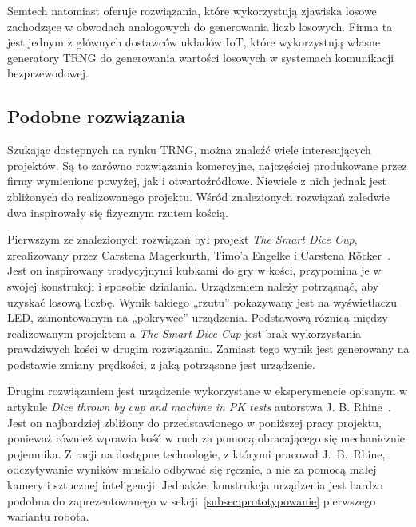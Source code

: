 Semtech natomiast oferuje rozwiązania, które wykorzystują zjawiska losowe
zachodzące w obwodach analogowych do generowania liczb losowych.
Firma ta jest jednym z głównych dostawców układów IoT, które wykorzystują własne generatory TRNG
do generowania wartości losowych w systemach komunikacji bezprzewodowej.


\subsection{Podobne rozwiązania}\label{sec:podobne-rozwiazania}

Szukając dostępnych na rynku TRNG, można znaleźć wiele interesujących projektów. Są to zarówno rozwiązania komercyjne, 
najczęściej produkowane przez firmy wymienione powyżej, jak i otwartoźródłowe. Niewiele z nich jednak jest zbliżonych 
do realizowanego projektu. Wśród znalezionych rozwiązań zaledwie dwa inspirowały się fizycznym rzutem kością.

Pierwszym ze znalezionych rozwiązań był projekt \textit{The Smart Dice Cup}, zrealizowany przez Carstena Magerkurth,
Timo'a Engelke i Carstena Röcker~\cite{SmartDice}.
Jest on inspirowany tradycyjnymi kubkami do gry w kości, przypomina je w swojej konstrukcji i sposobie działania.
Urządzeniem należy potrząsnąć, aby uzyskać losową liczbę.
Wynik takiego „rzutu” pokazywany jest na wyświetlaczu LED, zamontowanym na „pokrywce” urządzenia.
Podstawową różnicą między realizowanym projektem a \textit{The Smart Dice Cup} jest brak wykorzystania prawdziwych
kości w drugim rozwiązaniu.
Zamiast tego wynik jest generowany na podstawie zmiany prędkości, z jaką potrząsane jest urządzenie.

Drugim rozwiązaniem jest urządzenie wykorzystane w eksperymencie opisanym w artykule \textit{Dice thrown by cup and machine in PK tests} autorstwa J. B. Rhine~\cite{betoniarka43}.
Jest on najbardziej zbliżony do przedstawionego w poniższej pracy projektu, ponieważ również wprawia kość w
ruch za pomocą obracającego się mechanicznie pojemnika.
Z racji na dostępne technologie, z którymi pracował J.~B.~Rhine, odczytywanie wyników musiało odbywać się ręcznie, a nie za pomocą małej kamery i sztucznej inteligencji.
Jednakże, konstrukcja urządzenia jest bardzo podobna do zaprezentowanego w sekcji~\ref{subsec:prototypowanie} pierwszego wariantu robota.